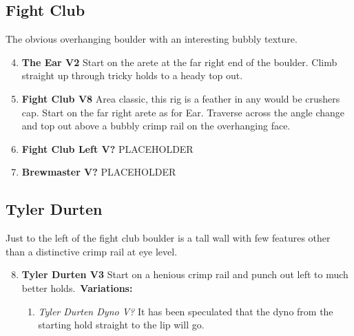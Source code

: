 \subsection*{Fight Club}\label{bf:Fight Club}
The obvious overhanging boulder with an interesting bubbly texture.

\label{pt:Fight Club}
\begin{enumerate}[]
	\setcounter{enumi}{3}
	\item\label{rt:The Ear} \colorbox{green!20}{\textbf{The Ear V2     } }
	\newline Start on the arete at the far right end of the boulder. Climb straight up through tricky holds to a heady top out.\
	\setcounter{enumi}{4}
	\item\label{rt:Fight Club} \colorbox{Goldenrod!50}{\textbf{Fight Club V8     } }
	\newline Area classic, this rig is a feather in any would be crushers cap. Start on the far right arete as for Ear. Traverse across the angle change and top out above a bubbly crimp rail on the overhanging face.\
	\setcounter{enumi}{5}
	\item\label{rt:Fight Club Left} \colorbox{black!20}{\textbf{Fight Club Left V?  } }
	\newline PLACEHOLDER\
	\setcounter{enumi}{6}
	\item\label{rt:Brewmaster} \colorbox{black!20}{\textbf{Brewmaster V?  } }
	\newline PLACEHOLDER\
\end{enumerate}
\subsection*{Tyler Durten}\label{bf:Tyler Durten}
Just to the left of the fight club boulder is a tall wall with few features other than a distinctive crimp rail at eye level.

\begin{enumerate}[]
	\setcounter{enumi}{7}
	\item\label{rt:Tyler Durten} \colorbox{green!20}{\textbf{Tyler Durten V3 \ding{72}  } }
	\newline Start on a henious crimp rail and punch out left to much better holds.\
	\newline \textbf{Variations:}
	\begin{enumerate}
		\item\label{vr:Tyler Durten Dyno} \colorbox{black!20}{\emph{Tyler Durten Dyno V?  }  }
		\newline It has been speculated that the dyno from the starting hold straight to the lip will go.\
	\end{enumerate}
\end{enumerate}
